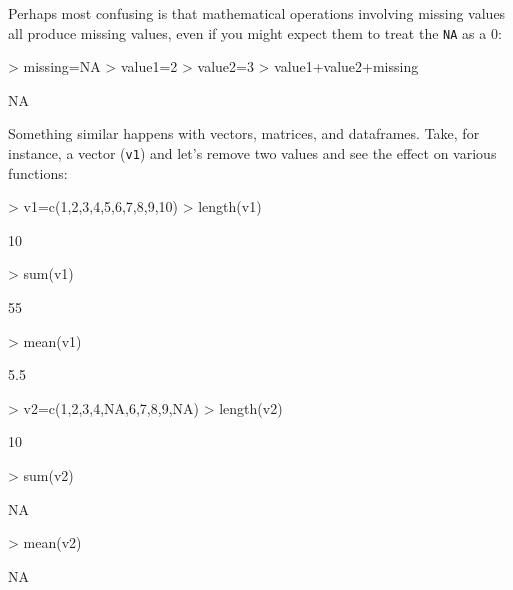 \documentclass[12pt]{article}
\begin{document}
Perhaps most confusing is that mathematical operations involving missing values all produce missing values, even if you might expect them to treat the \verb|NA| as a 0:
\begin{Schunk}
\begin{Sinput}
> missing=NA
> value1=2
> value2=3
> value1+value2+missing
\end{Sinput}
\begin{Soutput}
[1] NA
\end{Soutput}
\end{Schunk}

Something similar happens with vectors, matrices, and dataframes. Take, for instance, a vector (\verb|v1|) and let's remove two values and see the effect on various functions:
\begin{Schunk}
\begin{Sinput}
> v1=c(1,2,3,4,5,6,7,8,9,10)
> length(v1)
\end{Sinput}
\begin{Soutput}
[1] 10
\end{Soutput}
\begin{Sinput}
> sum(v1)
\end{Sinput}
\begin{Soutput}
[1] 55
\end{Soutput}
\begin{Sinput}
> mean(v1)
\end{Sinput}
\begin{Soutput}
[1] 5.5
\end{Soutput}
\begin{Sinput}
> v2=c(1,2,3,4,NA,6,7,8,9,NA)
> length(v2)
\end{Sinput}
\begin{Soutput}
[1] 10
\end{Soutput}
\begin{Sinput}
> sum(v2)
\end{Sinput}
\begin{Soutput}
[1] NA
\end{Soutput}
\begin{Sinput}
> mean(v2)
\end{Sinput}
\begin{Soutput}
[1] NA
\end{Soutput}
\end{Schunk}
\end{document}
